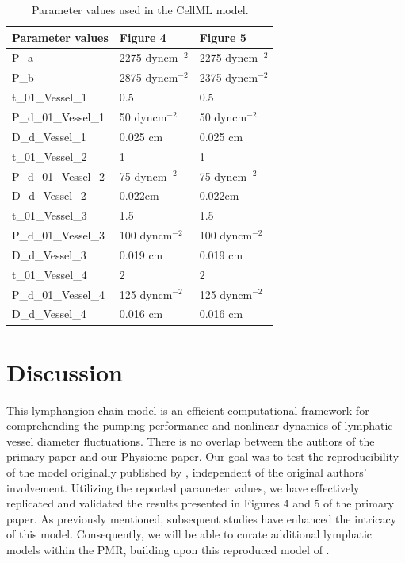 \documentclass[fleqn,10pt]{physiome}
\begin{document}
\begin{table}[h]
\caption{Parameter values used in the CellML model.}
\label{table_para1}
\begin{center}


\begin{tabular}{|l|l|l|}
\hline
Parameter values    & Figure 4     & Figure 5     \\
\hline
P\_a                & 2275 dyncm$^{-2}$ & 2275 dyncm$^{-2}$ \\
P\_b                & 2875 dyncm$^{-2}$ & 2375 dyncm$^{-2}$ \\
t\_01\_Vessel\_1    & 0.5          & 0.5          \\
P\_d\_01\_Vessel\_1 & 50 dyncm$^{-2}$   & 50 dyncm$^{-2}$   \\
D\_d\_Vessel\_1     & 0.025 cm     & 0.025 cm     \\
t\_01\_Vessel\_2    & 1            & 1            \\
P\_d\_01\_Vessel\_2 & 75 dyncm$^{-2}$   & 75 dyncm$^{-2}$   \\
D\_d\_Vessel\_2     & 0.022cm      & 0.022cm      \\
t\_01\_Vessel\_3    & 1.5          & 1.5          \\
P\_d\_01\_Vessel\_3 & 100 dyncm$^{-2}$  & 100 dyncm$^{-2}$  \\
D\_d\_Vessel\_3     & 0.019 cm     & 0.019 cm     \\
t\_01\_Vessel\_4    & 2            & 2            \\
P\_d\_01\_Vessel\_4 & 125 dyncm$^{-2}$  & 125 dyncm$^{-2}$  \\
D\_d\_Vessel\_4     & 0.016 cm     & 0.016 cm   \\ 
\hline
\end{tabular}
\end{center}
\end{table}

\newpage

\section{Discussion}
This lymphangion chain model is an efficient computational framework for comprehending the pumping performance and nonlinear dynamics of lymphatic vessel diameter fluctuations. There is no overlap between the authors of the primary paper and our Physiome paper. Our goal was to test the reproducibility of the model originally published by \cite{bertram2011simulation}, independent of the original authors' involvement. Utilizing the reported parameter values, we have effectively replicated and validated the results presented in Figures 4 and 5 of the primary paper. As previously mentioned, subsequent studies have enhanced the intricacy of this model. Consequently, we will be able to curate additional lymphatic models within the PMR, building upon this reproduced model of \cite{bertram2011simulation}.
\end{document}
